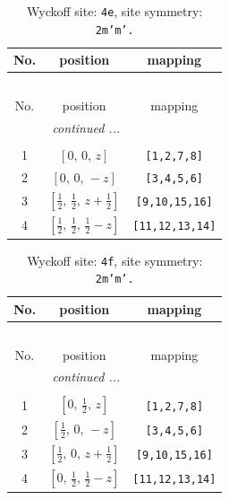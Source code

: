 \documentclass[fleqn,8pt]{jsarticle}
\begin{document}
\begin{longtable}{ccc}
\caption{Wyckoff site: {\tt 4e}, site symmetry: {\tt 2m'm'.}}
 \\
 \hline \hline
No. & position & mapping \\ \hline \endfirsthead

\multicolumn{2}{l}{\tablename\ \thetable{}} \\
 \hline \hline
No. & position & mapping \\ \hline \endhead

 \hline \hline
\multicolumn{2}{r}{\footnotesize\it continued ...} \\ \endfoot

 \hline \hline
\multicolumn{2}{r}{} \\ \endlastfoot

1 & $\left[ 0,\, 0,\, z \right]$ & {\tt [1,2,7,8]} \\ \hline
2 & $\left[ 0,\, 0,\, - z \right]$ & {\tt [3,4,5,6]} \\ \hline
3 & $\left[ \frac{1}{2},\, \frac{1}{2},\, z + \frac{1}{2} \right]$ & {\tt [9,10,15,16]} \\ \hline
4 & $\left[ \frac{1}{2},\, \frac{1}{2},\, \frac{1}{2} - z \right]$ & {\tt [11,12,13,14]} \\
\end{longtable}
\renewcommand{\arraystretch}{1.2}
\begin{longtable}{ccc}
\caption{Wyckoff site: {\tt 4f}, site symmetry: {\tt 2m'm'.}}
 \\
 \hline \hline
No. & position & mapping \\ \hline \endfirsthead

\multicolumn{2}{l}{\tablename\ \thetable{}} \\
 \hline \hline
No. & position & mapping \\ \hline \endhead

 \hline \hline
\multicolumn{2}{r}{\footnotesize\it continued ...} \\ \endfoot

 \hline \hline
\multicolumn{2}{r}{} \\ \endlastfoot

1 & $\left[ 0,\, \frac{1}{2},\, z \right]$ & {\tt [1,2,7,8]} \\ \hline
2 & $\left[ \frac{1}{2},\, 0,\, - z \right]$ & {\tt [3,4,5,6]} \\ \hline
3 & $\left[ \frac{1}{2},\, 0,\, z + \frac{1}{2} \right]$ & {\tt [9,10,15,16]} \\ \hline
4 & $\left[ 0,\, \frac{1}{2},\, \frac{1}{2} - z \right]$ & {\tt [11,12,13,14]} \\
\end{longtable}
\end{document}
